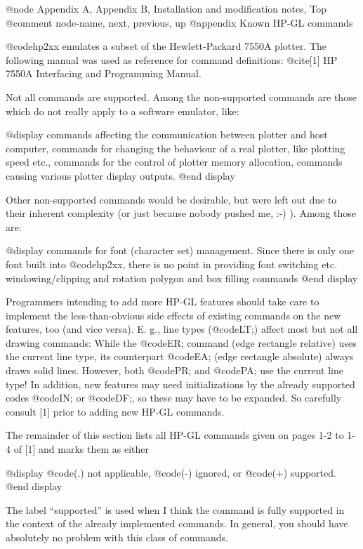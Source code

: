 @node Appendix A, Appendix B, Installation and modification notes, Top
@comment  node-name,  next,  previous,  up
@appendix   Known HP-GL commands

@code{hp2xx} emulates a subset of the Hewlett-Packard 7550A plotter.
The following manual was used as reference for command definitions:
@cite{[1] HP 7550A Interfacing and Programming Manual}.

Not all commands are supported. Among the non-supported commands
are those which do not really apply to a software emulator, like:

@display
commands affecting the communication between plotter and host computer,
commands for changing the behaviour of a real plotter, like plotting speed etc.,
commands for the control of plotter memory allocation,
commands causing various plotter display outputs.
@end display

Other non-supported commands would be desirable, but were left out
due to their inherent complexity (or just because nobody pushed me, :-) ).
Among those are:

@display
commands for font (character set) management. Since there is only one font
         built into @code{hp2xx}, there is no point in providing font switching etc.
windowing/clipping and rotation
polygon and box filling commands
@end display

Programmers intending to add more HP-GL features should take care to
implement the less-than-obvious side effects of existing commands on
the new features, too (and vice versa). E. g., line types (@code{LT;})
affect most but not all drawing commands: While the @code{ER;} command
(edge rectangle relative) uses the current line type, its counterpart
@code{EA;} (edge rectangle absolute) always draws solid lines. However,
both @code{PR;} and @code{PA;} use the current line type! In addition,
new features may need initializations by the already supported
codes @code{IN;} or @code{DF;}, so these may have to be expanded.
So carefully consult [1] prior to adding new HP-GL commands.

The remainder of this section lists all HP-GL commands given on
pages 1-2 to 1-4 of [1] and marks them as either

@display
      @code{(.)}  not applicable,
      @code{(-)}  ignored, or
      @code{(+)}  supported.
@end display

The label ``supported'' is used when I think the command is fully supported
in the context of the already implemented commands. In general,
you should have absolutely no problem with this class of commands.

